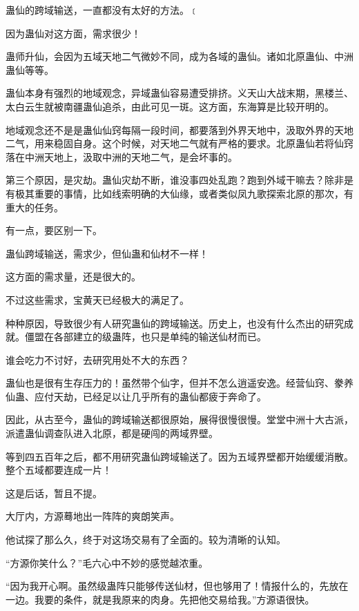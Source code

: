 
\begin{this_body}



蛊仙的跨域输送，一直都没有太好的方法。﹝

因为蛊仙对这方面，需求很少！

蛊师升仙，会因为五域天地二气微妙不同，成为各域的蛊仙。诸如北原蛊仙、中洲蛊仙等等。

蛊仙本身有强烈的地域观念，异域蛊仙容易遭受排挤。义天山大战末期，黑楼兰、太白云生就被南疆蛊仙追杀，由此可见一斑。这方面，东海算是比较开明的。

地域观念还不是是蛊仙仙窍每隔一段时间，都要落到外界天地中，汲取外界的天地二气，用来稳固自身。这个时候，对天地二气就有严格的要求。北原蛊仙若将仙窍落在中洲天地上，汲取中洲的天地二气，是会坏事的。

第三个原因，是灾劫。蛊仙灾劫不断，谁没事四处乱跑？跑到外域干嘛去？除非是有极其重要的事情，比如线索明确的大仙缘，或者类似凤九歌探索北原的那次，有重大的任务。

有一点，要区别一下。

蛊仙跨域输送，需求少，但仙蛊和仙材不一样！

这方面的需求量，还是很大的。

不过这些需求，宝黄天已经极大的满足了。

种种原因，导致很少有人研究蛊仙的跨域输送。历史上，也没有什么杰出的研究成就。僵盟在各部建立的级蛊阵，也只是单纯的输送仙材而已。

谁会吃力不讨好，去研究用处不大的东西？

蛊仙也是很有生存压力的！虽然带个仙字，但并不怎么逍遥安逸。经营仙窍、豢养仙蛊、应付天劫，已经足以让几乎所有的蛊仙都疲于奔命了。

因此，从古至今，蛊仙的跨域输送都很原始，展得很慢很慢。堂堂中洲十大古派，派遣蛊仙调查队进入北原，都是硬闯的两域界壁。

等到四五百年之后，都不用研究蛊仙跨域输送了。因为五域界壁都开始缓缓消散。整个五域都要连成一片！

这是后话，暂且不提。

大厅内，方源蓦地出一阵阵的爽朗笑声。

他试探了那么久，终于对这场交易有了全面的。较为清晰的认知。

“方源你笑什么？”毛六心中不妙的感觉越浓重。

“因为我开心啊。虽然级蛊阵只能够传送仙材，但也够用了！情报什么的，先放在一边。我要的条件，就是我原来的肉身。先把他交易给我。”方源语很快。


\end{this_body}
